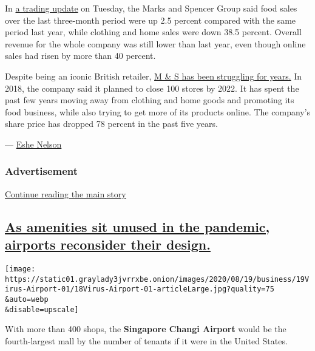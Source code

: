 In
\href{https://corporate.marksandspencer.com/media/press-releases/5e0f046f7880b21924350282/marks-and-spencer-group-plc-trading-update-and-streamlining-announcement}{a
trading update} on Tuesday, the Marks and Spencer Group said food sales
over the last three-month period were up 2.5 percent compared with the
same period last year, while clothing and home sales were down 38.5
percent. Overall revenue for the whole company was still lower than last
year, even though online sales had risen by more than 40 percent.

Despite being an iconic British retailer,
\href{https://www.nytimes3xbfgragh.onion/2018/10/02/business/marks-spencer-faded-glory.html}{M
\& S has been struggling for years.} In 2018, the company said it
planned to close 100 stores by 2022. It has spent the past few years
moving away from clothing and home goods and promoting its food
business, while also trying to get more of its products online. The
company's share price has dropped 78 percent in the past five years.

--- \href{https://www.nytimes3xbfgragh.onion/by/eshe-nelson}{Eshe
Nelson}

\hypertarget{advertisement-2}{%
\subsubsection{Advertisement}\label{advertisement-2}}

\protect\hyperlink{after-dfp-ad-mid3}{Continue reading the main story}

\hypertarget{as-amenities-sit-unused-in-the-pandemic-airports-reconsider-their-design}{%
\subsection{\texorpdfstring{\protect\hyperlink{as-amenities-sit-unused-in-the-pandemic-airports-reconsider-their-design}{As
amenities sit unused in the pandemic, airports reconsider their
design.}}{As amenities sit unused in the pandemic, airports reconsider their design.}}\label{as-amenities-sit-unused-in-the-pandemic-airports-reconsider-their-design}}

\texttt{[image: https://static01.graylady3jvrrxbe.onion/images/2020/08/19/business/19Virus-Airport-01/18Virus-Airport-01-articleLarge.jpg?quality=75\\\&auto=webp\\\&disable=upscale]}

With more than 400 shops, the \textbf{Singapore Changi Airport} would be
the fourth-largest mall by the number of tenants if it were in the
United States.

